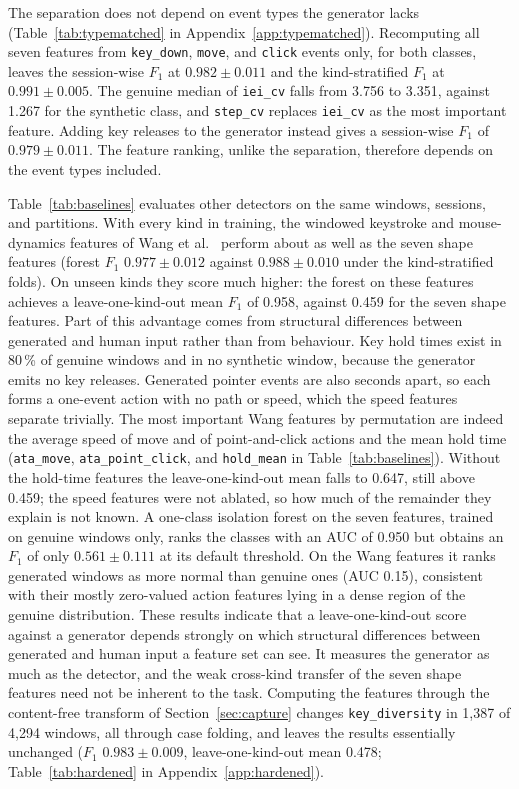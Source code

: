 \documentclass[sensors,article,submit,pdftex,oneauthor]{Definitions/mdpi}
\begin{document}
The separation does not depend on event types the generator lacks (Table~\ref{tab:typematched} in Appendix~\ref{app:typematched}). Recomputing all seven features from \texttt{key\_down}, \texttt{move}, and \texttt{click} events only, for both classes, leaves the session-wise $F_1$ at $0.982 \pm 0.011$ and the kind-stratified $F_1$ at $0.991 \pm 0.005$. The genuine median of \texttt{iei\_cv} falls from 3.756 to 3.351, against 1.267 for the synthetic class, and \texttt{step\_cv} replaces \texttt{iei\_cv} as the most important feature. Adding key releases to the generator instead gives a session-wise $F_1$ of $0.979 \pm 0.011$. The feature ranking, unlike the separation, therefore depends on the event types included.

Table~\ref{tab:baselines} evaluates other detectors on the same windows, sessions, and partitions. With every kind in training, the windowed keystroke and mouse-dynamics features of Wang et al.~\cite{wang2022siurua} perform about as well as the seven shape features (forest $F_1$ $0.977 \pm 0.012$ against $0.988 \pm 0.010$ under the kind-stratified folds). On unseen kinds they score much higher: the forest on these features achieves a leave-one-kind-out mean $F_1$ of 0.958, against 0.459 for the seven shape features. Part of this advantage comes from structural differences between generated and human input rather than from behaviour. Key hold times exist in 80\,\% of genuine windows and in no synthetic window, because the generator emits no key releases. Generated pointer events are also seconds apart, so each forms a one-event action with no path or speed, which the speed features separate trivially. The most important Wang features by permutation are indeed the average speed of move and of point-and-click actions and the mean hold time (\texttt{ata\_move}, \texttt{ata\_point\_click}, and \texttt{hold\_mean} in Table~\ref{tab:baselines}). Without the hold-time features the leave-one-kind-out mean falls to 0.647, still above 0.459; the speed features were not ablated, so how much of the remainder they explain is not known. A one-class isolation forest on the seven features, trained on genuine windows only, ranks the classes with an AUC of 0.950 but obtains an $F_1$ of only $0.561 \pm 0.111$ at its default threshold. On the Wang features it ranks generated windows as more normal than genuine ones (AUC 0.15), consistent with their mostly zero-valued action features lying in a dense region of the genuine distribution. These results indicate that a leave-one-kind-out score against a generator depends strongly on which structural differences between generated and human input a feature set can see. It measures the generator as much as the detector, and the weak cross-kind transfer of the seven shape features need not be inherent to the task. Computing the features through the content-free transform of Section~\ref{sec:capture} changes \texttt{key\_diversity} in 1,387 of 4,294 windows, all through case folding, and leaves the results essentially unchanged ($F_1$ $0.983 \pm 0.009$, leave-one-kind-out mean 0.478; Table~\ref{tab:hardened} in Appendix~\ref{app:hardened}).
\end{document}
